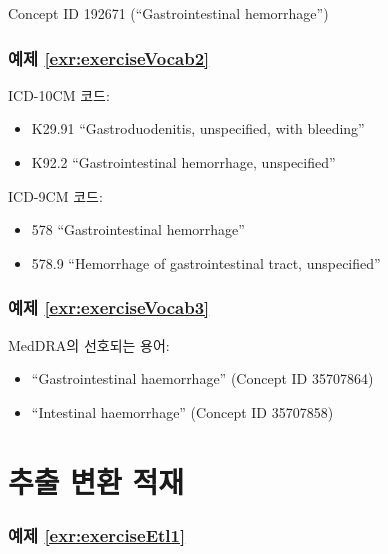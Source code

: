 \documentclass[10.5pt]{book}
\providecommand{\tightlist}{%
  \setlength{\itemsep}{0pt}\setlength{\parskip}{0pt}}
\theoremstyle{definition}
\theoremstyle{definition}
\theoremstyle{definition}
\theoremstyle{remark}
\begin{document}
Concept ID 192671 (``Gastrointestinal hemorrhage'')

\subsubsection*{예제
\ref{exr:exerciseVocab2}}\label{-refexrexercisevocab2}

ICD-10CM 코드:

\begin{itemize}
\tightlist
\item
  K29.91 ``Gastroduodenitis, unspecified, with bleeding''
\item
  K92.2 ``Gastrointestinal hemorrhage, unspecified''
\end{itemize}

ICD-9CM 코드:

\begin{itemize}
\tightlist
\item
  578 ``Gastrointestinal hemorrhage''
\item
  578.9 ``Hemorrhage of gastrointestinal tract, unspecified''
\end{itemize}

\subsubsection*{예제
\ref{exr:exerciseVocab3}}\label{-refexrexercisevocab3}

MedDRA의 선호되는 용어:

\begin{itemize}
\tightlist
\item
  ``Gastrointestinal haemorrhage'' (Concept ID 35707864)
\item
  ``Intestinal haemorrhage'' (Concept ID 35707858)
\end{itemize}

\section{추출 변환 적재}\label{Etlanswers}

\subsubsection*{예제 \ref{exr:exerciseEtl1}}\label{-refexrexerciseetl1}
\end{document}

